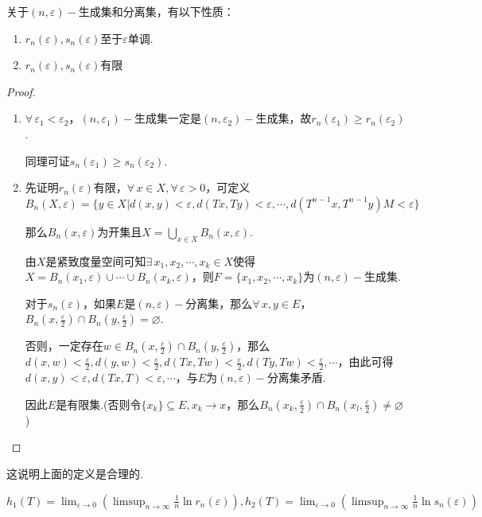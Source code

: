 关于$(n,\varepsilon)-$生成集和分离集，有以下性质：
\begin{proposition}{}
    \begin{enumerate}[(1)]
        \item $r_n(\varepsilon),s_n(\varepsilon)$至于$\varepsilon$单调.
        \item $r_n(\varepsilon),s_n(\varepsilon)$有限
    \end{enumerate}
\end{proposition}
\begin{proof}
    \begin{enumerate}[(1)]
        \item $\forall\,\varepsilon_1<\varepsilon_2$，$(n,\varepsilon_1)-$生成集一定是$(n,\varepsilon_2)-$生成集，故$r_n(\varepsilon_1)\geq r_n(\varepsilon_2)$.\par
        同理可证$s_n(\varepsilon_1)\geq s_n(\varepsilon_2)$.
        \item 先证明$r_n(\varepsilon)$有限，$\forall\, x\in X,\forall\, \varepsilon>0$，可定义$B_n(X,\varepsilon)=\{y\in X|d(x,y)<\varepsilon,d(Tx,Ty)<\varepsilon,\cdots,d(T^{n-1}x,T^{n-1}y)M<\varepsilon\}$\par
        那么$B_n(x,\varepsilon)$为开集且$X=\bigcup_{x\in X}B_n(x,\varepsilon)$.\par
        由$X$是紧致度量空间可知$\exists\, x_1,x_2,\cdots,x_k\in X$使得$X=B_n(x_1,\varepsilon)\cup\cdots\cup B_n(x_k,\varepsilon)$，则$F=\{x_1,x_2,\cdots,x_k\}$为$(n,\varepsilon)-$生成集.\par
        对于$s_n(\varepsilon)$，如果$E$是$(n,\varepsilon)-$分离集，那么$\forall\,x,y\in E$，$B_n \left(x,\frac{\varepsilon}{2}\right)\cap B_n \left(y,\frac{\varepsilon}{2}\right)=\varnothing$.\par
        否则，一定存在$w\in B_n \left(x,\frac{\varepsilon}{2}\right)\cap B_n \left(y,\frac{\varepsilon}{2}\right)$，那么$d(x,w)<\frac{\varepsilon}{2},d(y,w)<\frac{\varepsilon}{2},d(Tx,Tw)<\frac{\varepsilon}{2},d(Ty,Tw)<\frac{\varepsilon}{2},\cdots$，由此可得$d(x,y)<\varepsilon,d(Tx,T)<\varepsilon,\cdots$，与$E$为$(n,\varepsilon)-$分离集矛盾.\par
        因此$E$是有限集.(否则令$\{x_k\}\subseteq E,x_k\to x$，那么$B_n \left(x_k,\frac{\varepsilon}{2}\right)\cap B_n(x_l,\frac{\varepsilon}{2})\neq\varnothing$)
    \end{enumerate}
\end{proof}
这说明上面的定义是合理的.

\begin{definition}{}
    $h_1(T)=\lim_{\varepsilon\to 0}\left(\limsup_{n\to\infty}\frac{1}{n}\ln{r_n(\varepsilon)}\right),h_2(T)=\lim_{\varepsilon\to 0}\left(\limsup_{n\to\infty}\frac{1}{n}\ln{s_n(\varepsilon)}\right)$
\end{definition}

